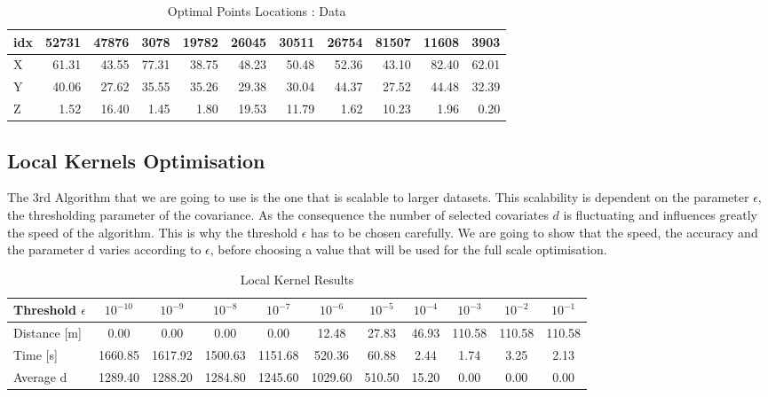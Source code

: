 \begin{table}[h]
\centering
\footnotesize
\begin{tabular}{|l|rrrrrrrrrr|}
\hline
idx &  52731 &  47876 &  3078  &  19782 &  26045 &  30511 &  26754 &  81507 &  11608 &  3903  \\
\hline
X &  61.31 &  43.55 &  77.31 &  38.75 &  48.23 &  50.48 &  52.36 &  43.10 &  82.40 &  62.01 \\
Y &  40.06 &  27.62 &  35.55 &  35.26 &  29.38 &  30.04 &  44.37 &  27.52 &  44.48 &  32.39 \\
Z &   1.52 &  16.40 &   1.45 &   1.80 &  19.53 &  11.79 &   1.62 &  10.23 &   1.96 &   0.20 \\
\hline
\end{tabular}
\caption{Optimal Points Locations : Data}
\label{tab:opt_small}
\end{table}

\subsection{Local Kernels Optimisation}

The 3rd Algorithm that we are going to use is the one that is scalable to larger datasets. This scalability is dependent on the parameter $\epsilon$, the thresholding parameter of the covariance. As the consequence the number of selected covariates $d$ is fluctuating and influences greatly the speed of the algorithm. This is why the threshold $\epsilon$ has to be chosen carefully. We are going to show that the speed, the accuracy and the parameter d varies according to $\epsilon$, before choosing a value that will be used for the full scale optimisation. \\


\begin{table}[h!]
\centering
\scriptsize
\begin{tabular}{|l|c|c|c|c|c|c|c|c|c|c|}
  \hline
  Threshold $\epsilon$ & $10^{-10} $ &  $10^{-9}$ & $10^{-8}$ & $10^{-7}$ & $10^{-6}$ & $10^{-5}$ & $10^{-4}$ & $10^{-3}$ & $10^{-2}$ & $10^{-1}$ \\
    \hline
  Distance [m]       &    0.00 &    0.00 &    0.00 &    0.00 &   12.48 &  27.83 & 46.93 & 110.58 & 110.58 & 110.58 \\
Time [s]       & 1660.85 & 1617.92 & 1500.63 & 1151.68 &  520.36 &  60.88 &  2.44 &   1.74 &   3.25 &   2.13 \\
Average d & 1289.40 & 1288.20 & 1284.80 & 1245.60 & 1029.60 & 510.50 & 15.20 &   0.00 &   0.00 &   0.00 \\
  \hline
\end{tabular}
\caption{Local Kernel Results}
\end{table}

